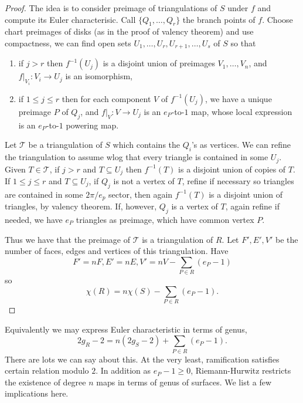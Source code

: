 \documentclass[a4paper]{article}
\begin{document}
\begin{proof}
  The idea is to consider preimage of triangulations of \(S\) under \(f\) and compute its Euler characterisic. Call \(\{Q_1, \dots, Q_r\}\) the branch points of \(f\). Choose chart preimages of disks (as in the proof of valency theorem) and use compactness, we can find open sets \(U_1, \dots, U_r, U_{r + 1}, \dots, U_s\) of \(S\) so that
  \begin{enumerate}
  \item if \(j > r\) then \(f^{-1}(U_j)\) is a disjoint union of preimages \(V_1, \dots, V_n\), and \(f|_{V_i}: V_i \to U_j\) is an isomorphism,
  \item if \(1 \leq j \leq r\) then for each component \(V\) of \(f^{-1}(U_j)\), we have a unique preimage \(P\) of \(Q_j\), and \(f|_V: V \to U_j\) is an \(e_P\)-to-\(1\) map, whose local expression is an \(e_P\)-to-\(1\) powering map.
  \end{enumerate}
  Let \(\mathcal T\) be a triangulation of \(S\) which contains the \(Q_i\)'s as vertices. We can refine the triangulation to assume wlog that every triangle is contained in some \(U_j\). Given \(T \in \mathcal T\), if \(j > r\) and \(T \subseteq U_j\) then \(f^{-1}(T)\) is a disjoint union of copies of \(T\). If \(1 \leq j \leq r\) and \(T \subseteq U_j\), if \(Q_j\) is not a vertex of \(T\), refine if necessary so triangles are contained in some \(2\pi/e_p\) sector, then again \(f^{-1}(T)\) is a disjoint union of triangles, by valency theorem. If, however, \(Q_j\) is a vertex of \(T\), again refine if needed, we have \(e_P\) triangles as preimage, which have common vertex \(P\).

  Thus we have that the preimage of \(\mathcal T\) is a triangulation of \(R\). Let \(F', E', V'\) be the number of faces, edges and vertices of this triangulation. Have
  \[
    F' = nF, E' = nE, V' = nV - \sum_{P \in R}(e_P - 1)
  \]
  so
  \[
    \chi(R) = n \chi(S) - \sum_{P \in R}(e_P - 1).
  \]
\end{proof}

\begin{remark}
  Equivalently we may express Euler characteristic in terms of genus,
  \[
    2g_R - 2 = n(2g_S - 2) + \sum_{P \in R}(e_P - 1).
  \]
  There are lots we can say about this. At the very least, ramification satisfies certain relation modulo \(2\). In addition as \(e_P - 1 \geq 0\), Riemann-Hurwitz restricts the existence of degree \(n\) maps in terms of genus of surfaces. We list a few implications here.
\end{remark}
\end{document}
